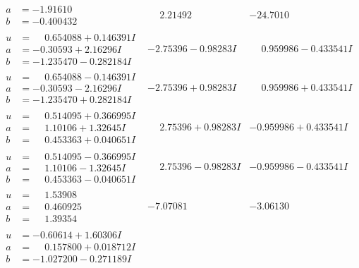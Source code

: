 \documentclass[1p]{elsarticle_modified}
\theoremstyle{definition}
\begin{document}
$$\begin{array}{c|c|c}
\begin{aligned}
a &= -1.91610\phantom{ +0.000000I} \\
b &= -0.400432\phantom{ +0.000000I}\end{aligned}
 & \phantom{-}2.21492\phantom{ +0.000000I} & -24.7010\phantom{ +0.000000I} \\ \hline\begin{aligned}
u &= \phantom{-}0.654088 + 0.146391 I \\
a &= -0.30593 + 2.16296 I \\
b &= -1.235470 - 0.282184 I\end{aligned}
 & -2.75396 - 0.98283 I & \phantom{-}0.959986 - 0.433541 I \\ \hline\begin{aligned}
u &= \phantom{-}0.654088 - 0.146391 I \\
a &= -0.30593 - 2.16296 I \\
b &= -1.235470 + 0.282184 I\end{aligned}
 & -2.75396 + 0.98283 I & \phantom{-}0.959986 + 0.433541 I \\ \hline\begin{aligned}
u &= \phantom{-}0.514095 + 0.366995 I \\
a &= \phantom{-}1.10106 + 1.32645 I \\
b &= \phantom{-}0.453363 + 0.040651 I\end{aligned}
 & \phantom{-}2.75396 + 0.98283 I & -0.959986 + 0.433541 I \\ \hline\begin{aligned}
u &= \phantom{-}0.514095 - 0.366995 I \\
a &= \phantom{-}1.10106 - 1.32645 I \\
b &= \phantom{-}0.453363 - 0.040651 I\end{aligned}
 & \phantom{-}2.75396 - 0.98283 I & -0.959986 - 0.433541 I \\ \hline\begin{aligned}
u &= \phantom{-}1.53908\phantom{ +0.000000I} \\
a &= \phantom{-}0.460925\phantom{ +0.000000I} \\
b &= \phantom{-}1.39354\phantom{ +0.000000I}\end{aligned}
 & -7.07081\phantom{ +0.000000I} & -3.06130\phantom{ +0.000000I} \\ \hline\begin{aligned}
u &= -0.60614 + 1.60306 I \\
a &= \phantom{-}0.157800 + 0.018712 I \\
b &= -1.027200 - 0.271189 I\end{aligned}

\end{array}$$
\end{document}
